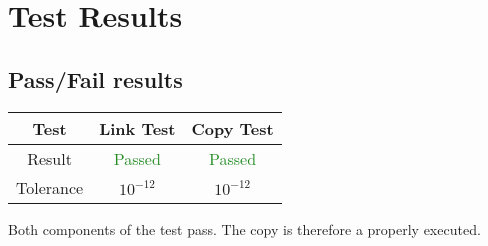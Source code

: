 \section{Test Results}
\subsection{Pass/Fail results}

\begin{center}
\begin{tabular}{c|c|c}
Test & Link Test & Copy Test \\ \hline
Result &  \textcolor{ForestGreen}{Passed} &  \textcolor{ForestGreen}{Passed} \\ \hline
Tolerance & $10^{-12}$ & $10^{-12}$
\end{tabular}
\end{center}

Both components of the test pass. The copy is therefore a properly executed.

